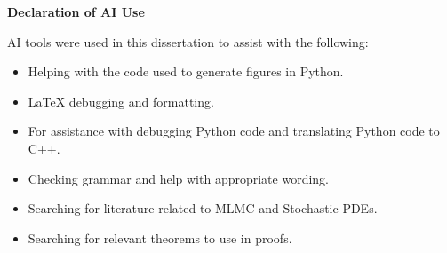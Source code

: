 \begin{center}
  \Huge\bfseries Declaration of AI Use
\end{center}
\vspace{2em}


AI tools were used in this dissertation to assist with the following:

\begin{itemize}
    \item Helping with the code used to generate figures in Python.
    \item LaTeX debugging and formatting.
    \item For assistance with debugging Python code and translating Python
          code to C++.
    \item Checking grammar and help with appropriate wording.
    \item Searching for literature related to MLMC and Stochastic PDEs.
    \item Searching for relevant theorems to use in proofs.
\end{itemize}
